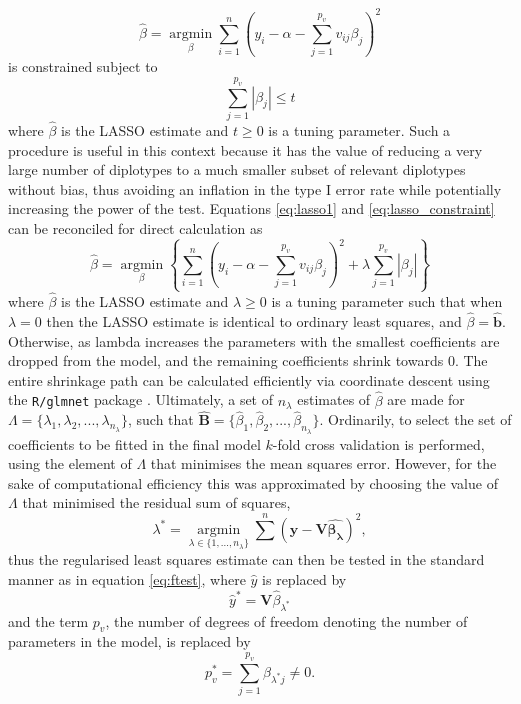 \begin{equation}
\hat{\beta} = \underset{\beta}{\operatorname{argmin}} \sum^{n}_{i=1} \left ( y_{i} - \alpha - \sum^{p_{v}}_{j=1} v_{ij} \beta_{j} \right )^2
\label{eq:lasso1}
\end{equation}
is constrained subject to 
\begin{equation}
\sum^{p_{v}}_{j=1} | \beta_{j} | \leq t
\label{eq:lasso_constraint}
\end{equation}
where $\hat{\beta}$ is the LASSO estimate and $t \geq 0$ is a tuning parameter. Such a procedure is useful in this context because it has the value of reducing a very large number of diplotypes to a much smaller subset of relevant diplotypes without bias, thus avoiding an inflation in the type I error rate while potentially increasing the power of the test. Equations \ref{eq:lasso1} and \ref{eq:lasso_constraint} can be reconciled for direct calculation as
\begin{equation}
\hat{\beta} = \underset{\beta}{\operatorname{argmin}} \left \{ \sum^{n}_{i=1} \left ( y_{i} - \alpha - \sum^{p_{v}}_{j=1} v_{ij} \beta_{j} \right )^2 + \lambda \sum^{p_{v}}_{j=1} | \beta_{j} | \right \}
\end{equation}
where $\hat{\beta}$ is the LASSO estimate and $\lambda \geq 0$ is a tuning parameter such that when $\lambda = 0$ then the LASSO estimate is identical to ordinary least squares, and $\hat{\beta} = \mathbf{\hat{b}}$. Otherwise, as lambda increases the parameters with the smallest coefficients are dropped from the model, and the remaining coefficients shrink towards 0. The entire shrinkage path can be calculated efficiently via coordinate descent using the {\tt R/glmnet} package \citep{Friedman2010}. Ultimately, a set of $n_{\lambda}$ estimates of $\hat{\beta}$ are made for $\Lambda = \{\lambda_{1}, \lambda_{2}, ..., \lambda_{n_{\lambda}} \}$, such that 
$\mathbf{\hat{B}} = \{ \hat{\beta}_{1}, \hat{\beta}_{2}, ..., \hat{\beta}_{n_{\lambda}} \}$. Ordinarily, to select the set of coefficients to be fitted in the final model $k$-fold cross validation is performed, using the element of $\Lambda$ that minimises the mean squares error. However, for the sake of computational efficiency this was approximated by choosing the value of $\Lambda$ that minimised the residual sum of squares,
\begin{equation}
\lambda^{*} = \underset{\lambda \in \{1, ..., n_{\lambda} \}}{\operatorname{argmin}} \sum^{n} (\mathbf{y} - \mathbf{V\hat{\beta_{\lambda}}})^2,
\end{equation}
thus the regularised least squares estimate can then be tested in the standard manner as in equation \ref{eq:ftest}, where $\hat{y}$ is replaced by
\begin{equation}
\hat{y}^{*} = \mathbf{V}\hat{\beta}_{\lambda^{*}}
\end{equation}
and the term $p_{v}$, the number of degrees of freedom denoting the number of parameters in the model, is replaced by
\begin{equation}
p^{*}_{v} = \sum^{p_{v}}_{j=1} \hat{\beta}_{\lambda^{*}j} \neq 0.
\end{equation}


